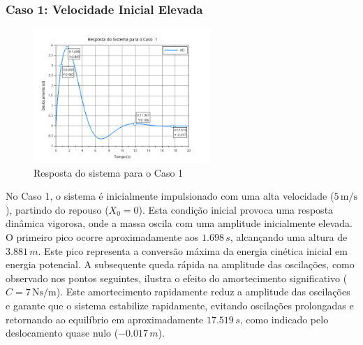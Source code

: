 \documentclass{article}
\begin{document}
\subsubsection{Caso 1: Velocidade Inicial Elevada}
\begin{figure}[H]
    \centering
    \includegraphics[width=0.6\textwidth]{atividades/1-atividade/assets/caso1.png}
    \caption{Resposta do sistema para o Caso 1}
\end{figure}
No Caso 1, o sistema é inicialmente impulsionado com uma alta velocidade (\(5 \, \text{m/s}\)), partindo do repouso (\(X_0 = 0\)). Esta condição inicial provoca uma resposta dinâmica vigorosa, onde a massa oscila com uma amplitude inicialmente elevada. O primeiro pico ocorre aproximadamente aos \(1.698 \, s\), alcançando uma altura de \(3.881 \, m\). Este pico representa a conversão máxima da energia cinética inicial em energia potencial. A subsequente queda rápida na amplitude das oscilações, como observado nos pontos seguintes, ilustra o efeito do amortecimento significativo (\(C = 7 \, \text{Ns/m}\)). Este amortecimento rapidamente reduz a amplitude das oscilações e garante que o sistema estabilize rapidamente, evitando oscilações prolongadas e retornando ao equilíbrio em aproximadamente \(17.519 \, s\), como indicado pelo deslocamento quase nulo (\(-0.017 \, m\)).
\end{document}
